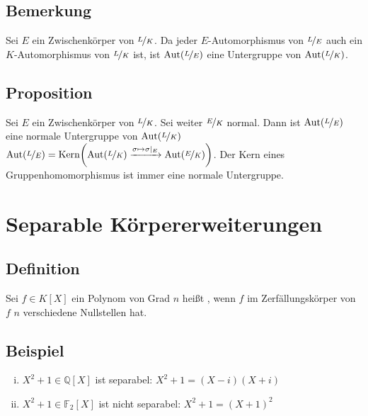 \subsection[Bemerkung: $\Aut(\nicefrac{L}{E})$ ist eine Untergruppe von $\Aut(\nicefrac{L}{K})$]{Bemerkung} %
\label{sub:156}
Sei $E$ ein Zwischenkörper von $\nicefrac{L}{K}$. Da jeder $E$-Automorphismus von $\nicefrac{L}{E}$ auch ein $K$-Automorphismus von $\nicefrac{L}{K}$ ist, ist $\Aut(\nicefrac{L}{E})$ eine Untergruppe von $\Aut(\nicefrac{L}{K})$.

\subsection[Proposition: Die Automorphismengruppe normaler Zwischenkörper ist normal]{Proposition} %
\label{sub:157}
Sei $E$ ein Zwischenkörper von $\nicefrac{L}{K}$. Sei weiter $\nicefrac{E}{K}$ normal. Dann ist $\Aut(\nicefrac{L}{E})$ eine normale Untergruppe von $\Aut(\nicefrac{L}{K})$
$\Aut(\nicefrac{L}{E}) = \Kern \enbrace*{\Aut(\nicefrac{L}{K}) \xrightarrow{\sigma \mapsto \sigma|_E } \Aut(\nicefrac{E}{K}) } $. Der Kern eines Gruppenhomomorphismus ist immer 
eine normale Untergruppe. \bewende
\newpage
\section{Separable Körpererweiterungen} %
\label{sec:16}

\subsection[Definition: Separable Polynome]{Definition} %
\label{sub:161}
Sei $f \in K[X]$ ein Polynom von Grad $n$ heißt , wenn $f$ im Zerfällungskörper von $f$ $n$ verschiedene Nullstellen hat.

\subsection[Beispiele für Separable und nicht separable Polynome]{Beispiel} %
\label{sub:162}
\begin{enumerate}[(i)]
	\item $X^2+1 \in \mathds{Q}[X]$ ist separabel: $X^2+1= (X-i)(X+i)$
	\item $X^2+1 \in \mathds{F}_2[X]$ ist nicht separabel: $X^2+1=(X+1)^2$
\end{enumerate}

